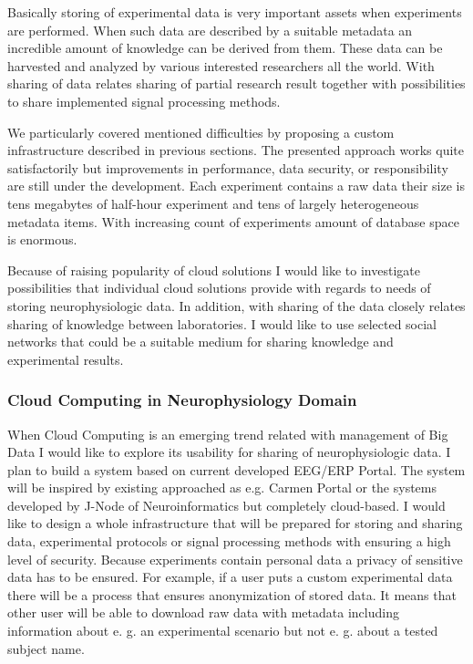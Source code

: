 \documentclass[a4paper, 10pt]{article}
\begin{document}
Basically storing of experimental data is very important assets when experiments are performed. When such data are described by a suitable metadata an incredible amount of knowledge can be derived from them. These data can be harvested and analyzed by various interested researchers all the world. With sharing of data relates sharing of partial research result together with possibilities to share implemented signal processing methods.

We particularly covered mentioned difficulties by proposing a custom infrastructure described in previous sections. The presented approach works quite satisfactorily but improvements in performance, data security, or responsibility are still under the development. Each experiment contains a raw data their size is tens megabytes of half-hour experiment and tens of largely heterogeneous metadata items. With increasing count of experiments amount of database space is enormous.

Because of raising popularity of cloud solutions I would like to investigate possibilities that individual cloud solutions provide with regards to needs of storing neurophysiologic data. In addition, with sharing of the data closely relates sharing of knowledge between laboratories. I would like to use selected social networks that could be a suitable medium for sharing knowledge and experimental results.

\subsubsection*{Cloud Computing in Neurophysiology Domain}

When Cloud Computing is an emerging trend related with management of Big Data I would like to explore its usability for sharing of neurophysiologic data. I plan to build a system based on current developed EEG/ERP Portal. The system will be inspired by existing approached as e.g. Carmen Portal or the systems developed by J-Node of Neuroinformatics but completely cloud-based.  I would like to design a whole infrastructure that will be prepared for storing and sharing data, experimental protocols or signal processing methods with ensuring a high level of security. Because experiments contain personal data a privacy of sensitive data has to be ensured. For example, if a user puts a custom experimental data there will be a process that ensures anonymization of stored data. It means that other user will be able to download raw data with metadata including information about e. g. an experimental scenario but not e. g. about a tested subject name.
\end{document}
